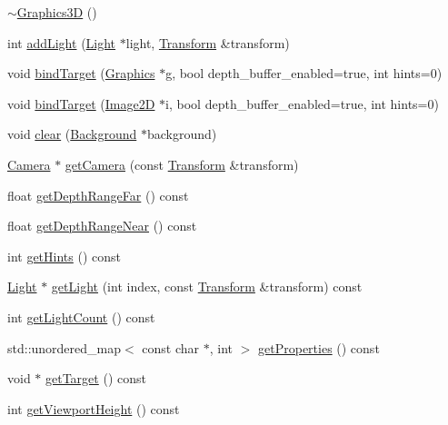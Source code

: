 \begin{CompactItemize}
\item 
\hyperlink{classm3g_1_1Graphics3D_9b9347476fc10e57b31694ac8a628511}{$\sim$Graphics3D} ()
\item 
int \hyperlink{classm3g_1_1Graphics3D_e210cacb72c8540df86a6674e3c2dc4f}{addLight} (\hyperlink{classm3g_1_1Light}{Light} $\ast$light, \hyperlink{classm3g_1_1Transform}{Transform} \&transform)
\item 
void \hyperlink{classm3g_1_1Graphics3D_2173e179f4b2d7130cde46a48794ee66}{bindTarget} (\hyperlink{classm3g_1_1Graphics}{Graphics} $\ast$g, bool depth\_\-buffer\_\-enabled=true, int hints=0)
\item 
void \hyperlink{classm3g_1_1Graphics3D_e3640472397d2b632496fa37c990b4bb}{bindTarget} (\hyperlink{classm3g_1_1Image2D}{Image2D} $\ast$i, bool depth\_\-buffer\_\-enabled=true, int hints=0)
\item 
void \hyperlink{classm3g_1_1Graphics3D_21c4a68a53cfbe0a7cec05d5a56682bf}{clear} (\hyperlink{classm3g_1_1Background}{Background} $\ast$background)
\item 
\hyperlink{classm3g_1_1Camera}{Camera} $\ast$ \hyperlink{classm3g_1_1Graphics3D_570b81f426d1b2b5e8794cffb33422c6}{getCamera} (const \hyperlink{classm3g_1_1Transform}{Transform} \&transform)
\item 
float \hyperlink{classm3g_1_1Graphics3D_c8c185b99073215202d2e35723f5c470}{getDepthRangeFar} () const 
\item 
float \hyperlink{classm3g_1_1Graphics3D_60bc116f673bf2782de2df3eebfb2c92}{getDepthRangeNear} () const 
\item 
int \hyperlink{classm3g_1_1Graphics3D_5837234a23dc5f46d3adec17f521b58e}{getHints} () const 
\item 
\hyperlink{classm3g_1_1Light}{Light} $\ast$ \hyperlink{classm3g_1_1Graphics3D_04272e584440c89fb4cb449003a84e7d}{getLight} (int index, const \hyperlink{classm3g_1_1Transform}{Transform} \&transform) const 
\item 
int \hyperlink{classm3g_1_1Graphics3D_7a08cfeb48d76ad5d8859a1fc0c77d98}{getLightCount} () const 
\item 
std::unordered\_\-map$<$ const char $\ast$, int $>$ \hyperlink{classm3g_1_1Graphics3D_a7d4779a1ea7779caf7f409c4d2bb31f}{getProperties} () const 
\item 
void $\ast$ \hyperlink{classm3g_1_1Graphics3D_02d0033930c8e68f4d7ebd43abe7980a}{getTarget} () const 
\item 
int \hyperlink{classm3g_1_1Graphics3D_d51e0c421126f5deb61b359cdb7dab2e}{getViewportHeight} () const 

\end{CompactItemize}
